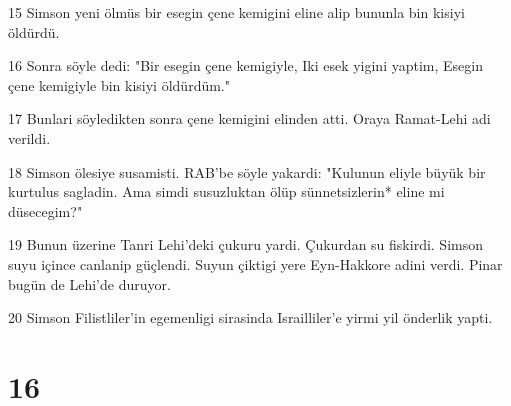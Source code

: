 \par 15 Simson yeni ölmüs bir esegin çene kemigini eline alip bununla bin kisiyi öldürdü.
\par 16 Sonra söyle dedi: "Bir esegin çene kemigiyle, Iki esek yigini yaptim, Esegin çene kemigiyle bin kisiyi öldürdüm."
\par 17 Bunlari söyledikten sonra çene kemigini elinden atti. Oraya Ramat-Lehi adi verildi.
\par 18 Simson ölesiye susamisti. RAB'be söyle yakardi: "Kulunun eliyle büyük bir kurtulus sagladin. Ama simdi susuzluktan ölüp sünnetsizlerin* eline mi düsecegim?"
\par 19 Bunun üzerine Tanri Lehi'deki çukuru yardi. Çukurdan su fiskirdi. Simson suyu içince canlanip güçlendi. Suyun çiktigi yere Eyn-Hakkore adini verdi. Pinar bugün de Lehi'de duruyor.
\par 20 Simson Filistliler'in egemenligi sirasinda Israilliler'e yirmi yil önderlik yapti.

\chapter{16}

